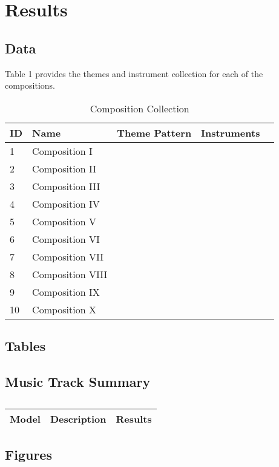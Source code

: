 \section{Results}

\subsection{Data}

Table 1 provides the themes and instrument collection for each of the compositions.
	
\begin{table}[H]
\caption{Composition Collection}	
\begin{tabular}{p{1cm}p{4cm}p{2cm}p{1cm}p{1cm}}
\hline
ID & Name & Theme Pattern & Instruments & \\
\hline 
1 & Composition I &  &  & \\
2 & Composition II &  &  & \\
3 & Composition III &  & \\
4 & Composition IV & & \\
5 & Composition V & & & \\
\hline 
6 & Composition VI &  &  & \\
7 & Composition VII &  &  & \\
8 & Composition VIII &  & \\
9 & Composition IX & & \\
10 & Composition X & & & \\
\end{tabular}
\end{table}

\subsection{Tables}

\subsection{Music Track Summary}

\centering	
\begin{table}[H]\tiny
	\caption{}	
	\begin{tabular}{r|p{4cm}|l}
		\hline	
		Model & Description & Results \\
		\hline 
		\hline 
	\end{tabular}
\end{table}


\subsection{Figures}

